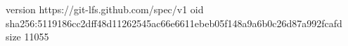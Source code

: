 version https://git-lfs.github.com/spec/v1
oid sha256:5119186cc2dff48d11262545ac66e6611ebeb05f148a9a6b0c26d87a992fcafd
size 11055
